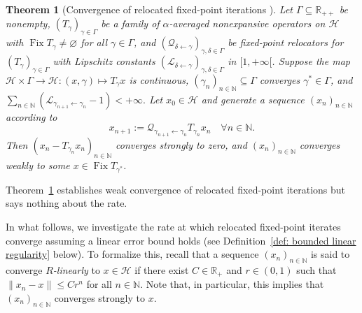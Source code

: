 \documentclass[a4paper,12pt]{article}
\newtheorem{theorem}{Theorem}[section]
\DeclareMathOperator{\Fix}{Fix}
\begin{document}
\begin{theorem}[Convergence of relocated fixed-point iterations {\cite[Theorem 4.5]{atenas2025relocated}}] \label{thm:Convergence of fixed-point relocator}
 Let $\Gamma \subseteq \mathbb{R}_{++}$ be nonempty,  $(T_{\gamma})_{\gamma\in\Gamma}$ be a family of $\alpha$-averaged nonexpansive operators on $\mathcal{H}$ with  $\Fix T_{\gamma} \neq\varnothing$ for all $\gamma\in\Gamma$, and $(\mathcal{Q}_{\delta\gets \gamma})_{\gamma,\delta \in \Gamma}$ be fixed-point relocators for $(T_{\gamma})_{\gamma \in \Gamma}$ with Lipschitz constants $(\mathcal{L}_{\delta\gets \gamma})_{\gamma,\delta \in \Gamma} $ in $[1,+\infty[$. 
 Suppose the map $\mathcal{H}\times \Gamma\to \mathcal{H}\colon (x,\gamma)\mapsto T_{\gamma}x$ is continuous, $(\gamma_n)_{n\in\mathbb{N}} \subseteq \Gamma$ converges $\gamma^*\in \Gamma$, and  $\sum_{n\in\mathbb{N}} (\mathcal{L}_{\gamma_{n+1}\gets \gamma_n} -1) < +\infty.$
 Let $x_0 \in \mathcal{H}$ and generate a sequence $(x_n)_{n\in\mathbb{N}}$ according to
\begin{equation} \label{e:FPR-iteration}
x_{n+1} := \mathcal{Q}_{\gamma_{n+1}\gets \gamma_n}T_{\gamma_n}x_n \quad \forall n\in\mathbb{N}.
\end{equation} Then $(x_n-T_{\gamma_n}x_n)_{n\in\mathbb{N}}$ converges strongly to zero, and $(x_n)_{n\in\mathbb{N}}$ converges weakly to some $x \in \Fix T_{\gamma^*}$.
\end{theorem}




Theorem~\ref{thm:Convergence of fixed-point relocator} establishes weak convergence of relocated fixed-point iterations but says nothing about the rate.


In what follows, we investigate the rate at which relocated fixed-point iterates converge assuming a linear error bound holds (see Definition~\ref{def: bounded linear regularity} below). To formalize this, recall that a sequence $(x_n)_{n\in\mathbb{N}}$ is said to converge \emph{$R$-linearly} to $x\in\mathcal{H}$ if there exist $C\in\mathbb{R_{+}}$ and $r\in(0,1)$ such that $\|x_n-x\|\leq Cr^n$ for all $n\in\mathbb{N}$.  Note that, in particular, this implies that $(x_n)_{n \in \mathbb{N}}$ converges strongly to $x$.
\end{document}
